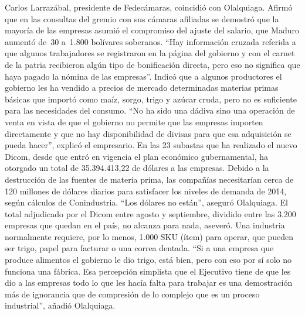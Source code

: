 \documentclass{article}%
\begin{document}
\newline%
%
Carlos Larrazábal, presidente de Fedecámaras, coincidió con Olalquiaga. Afirmó que en las consultas del gremio con sus cámaras afiliadas se demostró que la mayoría de las empresas asumió el compromiso del ajuste del salario, que Maduro aumentó de~30 a~1.800 bolívares soberanos.%
\newline%
%
“Hay información cruzada referida a que algunos trabajadores se registraron en la página del gobierno y con el carnet de la patria recibieron algún tipo de bonificación directa, pero eso no significa que haya pagado la nómina de las empresas”.%
\newline%
%
Indicó que a algunos productores el gobierno les ha vendido a precios de mercado determinadas materias primas básicas que importó como maíz, sorgo, trigo y azúcar cruda, pero no es suficiente para las necesidades del consumo. “No ha sido una dádiva sino una operación de venta en vista de que el gobierno no permite que las empresas importen directamente y que no hay disponibilidad de divisas para que esa adquisición se pueda hacer”, explicó el empresario.%
\newline%
%
En las 23 subastas que ha realizado el nuevo Dicom, desde que entró en vigencia el plan económico gubernamental, ha otorgado un total de 35.394.413,22 de dólares a las empresas. Debido a la destrucción de las fuentes de materia prima, las compañías necesitarían cerca de 120 millones de dólares diarios para satisfacer los niveles de demanda de 2014, según cálculos de Conindustria.%
\newline%
%
“Los dólares no están”, aseguró Olalquiaga. El total adjudicado por el Dicom entre agosto y septiembre, dividido entre las 3.200 empresas que quedan en el país, no alcanza para nada, aseveró.%
\newline%
%
Una industria normalmente requiere, por lo menos, 1.000 SKU (ítem) para operar, que pueden ser trigo, papel para facturar o una correa dentada. “Si a una empresa que produce alimentos el gobierno le dio trigo, está bien, pero con eso por sí solo no funciona una fábrica. Esa percepción simplista que el Ejecutivo tiene de que les dio a las empresas todo lo que les hacía falta para trabajar es una demostración más de ignorancia que de compresión de lo complejo que es un proceso industrial”, añadió Olalquiaga.%
\newline%
%
\end{document}
